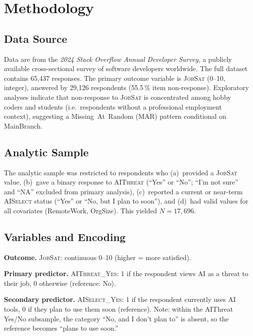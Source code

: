 \documentclass[11pt]{article}
\begin{document}
\section{Methodology}

\subsection{Data Source}

Data are from the \emph{2024 Stack Overflow Annual Developer Survey},
a publicly available cross-sectional survey of software developers worldwide.
The full dataset contains 65{,}437 responses. The primary outcome variable
is \textsc{JobSat} (0--10, integer), answered by 29{,}126 respondents
(55.5\,\% item non-response). Exploratory analyses indicate that non-response
to \textsc{JobSat} is concentrated among hobby coders and students
(i.e.\ respondents without a professional employment context), suggesting a
Missing~At~Random (MAR) pattern conditional on MainBranch.

\subsection{Analytic Sample}

The analytic sample was restricted to respondents who (a)~provided a
\textsc{JobSat} value, (b)~gave a binary response to \textsc{AIThreat}
(``Yes'' or ``No''; ``I'm not sure'' and ``NA'' excluded from primary analysis),
(c)~reported a current or near-term \textsc{AISelect} status (``Yes'' or
``No, but I plan to soon''), and (d)~had valid values for all covariates
(RemoteWork, OrgSize). This yielded $N = 17{,}696$.

\subsection{Variables and Encoding}

\textbf{Outcome.} \textsc{JobSat}: continuous 0--10 (higher = more satisfied).

\textbf{Primary predictor.} \textsc{AIThreat\_Yes}: 1 if the respondent views
AI as a threat to their job, 0 otherwise (reference: No).

\textbf{Secondary predictor.} \textsc{AISelect\_Yes}: 1 if the respondent
currently uses AI tools, 0 if they plan to use them soon (reference).
Note: within the AIThreat Yes/No subsample, the category
``No, and I don't plan to'' is absent, so the reference becomes
``plans to use soon.''
\end{document}
